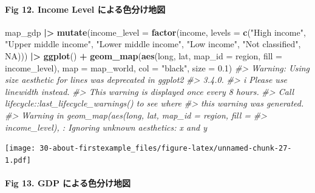 \documentclass[
  xelatex, ja=standard]{bxjsbook}
\newenvironment{Shaded}{\begin{snugshade}}{\end{snugshade}}
\newcommand{\AttributeTok}[1]{\textcolor[rgb]{0.13,0.29,0.53}{#1}}
\newcommand{\CommentTok}[1]{\textcolor[rgb]{0.56,0.35,0.01}{\textit{#1}}}
\newcommand{\ConstantTok}[1]{\textcolor[rgb]{0.56,0.35,0.01}{#1}}
\newcommand{\FloatTok}[1]{\textcolor[rgb]{0.00,0.00,0.81}{#1}}
\newcommand{\FunctionTok}[1]{\textcolor[rgb]{0.13,0.29,0.53}{\textbf{#1}}}
\newcommand{\NormalTok}[1]{#1}
\newcommand{\SpecialCharTok}[1]{\textcolor[rgb]{0.81,0.36,0.00}{\textbf{#1}}}
\newcommand{\StringTok}[1]{\textcolor[rgb]{0.31,0.60,0.02}{#1}}
\theoremstyle{definition}
\theoremstyle{definition}
\theoremstyle{definition}
\theoremstyle{definition}
\theoremstyle{remark}
\begin{document}
\hypertarget{fig-12.-income-level-ux306bux3088ux308bux8272ux5206ux3051ux5730ux56f3-1}{%
\paragraph{Fig 12. Income Level による色分け地図}\label{fig-12.-income-level-ux306bux3088ux308bux8272ux5206ux3051ux5730ux56f3-1}}

\begin{Shaded}
\begin{Highlighting}[]
\NormalTok{map\_gdp }\SpecialCharTok{|\textgreater{}} \FunctionTok{mutate}\NormalTok{(}\AttributeTok{income\_level =} \FunctionTok{factor}\NormalTok{(income, }\AttributeTok{levels =} \FunctionTok{c}\NormalTok{(}\StringTok{"High income"}\NormalTok{, }\StringTok{"Upper middle income"}\NormalTok{, }\StringTok{"Lower middle income"}\NormalTok{, }\StringTok{"Low income"}\NormalTok{, }\StringTok{"Not classified"}\NormalTok{, }\ConstantTok{NA}\NormalTok{))) }\SpecialCharTok{|\textgreater{}}
  \FunctionTok{ggplot}\NormalTok{() }\SpecialCharTok{+}
  \FunctionTok{geom\_map}\NormalTok{(}\FunctionTok{aes}\NormalTok{(long, lat, }\AttributeTok{map\_id =}\NormalTok{ region, }\AttributeTok{fill =}\NormalTok{ income\_level), }\AttributeTok{map =}\NormalTok{ map\_world, }\AttributeTok{col =} \StringTok{"black"}\NormalTok{, }\AttributeTok{size =} \FloatTok{0.1}\NormalTok{) }
\CommentTok{\#\textgreater{} Warning: Using \textasciigrave{}size\textasciigrave{} aesthetic for lines was deprecated in ggplot2}
\CommentTok{\#\textgreater{} 3.4.0.}
\CommentTok{\#\textgreater{} i Please use \textasciigrave{}linewidth\textasciigrave{} instead.}
\CommentTok{\#\textgreater{} This warning is displayed once every 8 hours.}
\CommentTok{\#\textgreater{} Call \textasciigrave{}lifecycle::last\_lifecycle\_warnings()\textasciigrave{} to see where}
\CommentTok{\#\textgreater{} this warning was generated.}
\CommentTok{\#\textgreater{} Warning in geom\_map(aes(long, lat, map\_id = region, fill =}
\CommentTok{\#\textgreater{} income\_level), : Ignoring unknown aesthetics: x and y}
\end{Highlighting}
\end{Shaded}

\texttt{[image: 30-about-firstexample\_files/figure-latex/unnamed-chunk-27-1.pdf]}

\hypertarget{fig-13.-gdp-ux306bux3088ux308bux8272ux5206ux3051ux5730ux56f3-1}{%
\paragraph{Fig 13. GDP による色分け地図}\label{fig-13.-gdp-ux306bux3088ux308bux8272ux5206ux3051ux5730ux56f3-1}}
\end{document}
